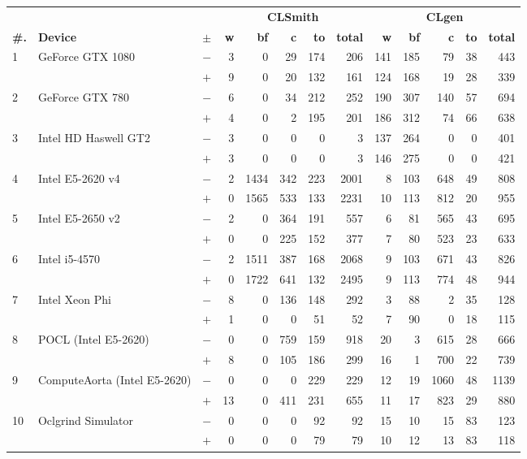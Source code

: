   \begin{tabular}{lll | rrrrr | rrrrr }
  \toprule
  & & & \multicolumn{5}{c|}{\textbf{CLSmith}} & \multicolumn{5}{c}{\textbf{CLgen}} \\
  \textbf{\#.} & \textbf{Device} & $\pm$ &
  \textbf{w} & \textbf{bf} & \textbf{c} & \textbf{to} & \textbf{total} &
  \textbf{w} & \textbf{bf} & \textbf{c} & \textbf{to} & \textbf{total} \\
  \midrule
  \multirow{ 2}{*}{1} & \multirow{ 2}{*}{GeForce GTX 1080} & $-$ & 3 & 0 & 29 & 174 & 206       & 141 & 185 & 79 & 38 & 443 \\& & $+$ & 9 & 0 & 20 & 132 & 161 & 124 & 168 & 19 & 28 & 339 \\
\hline
\multirow{ 2}{*}{2} & \multirow{ 2}{*}{GeForce GTX 780} & $-$ & 6 & 0 & 34 & 212 & 252       & 190 & 307 & 140 & 57 & 694 \\& & $+$ & 4 & 0 & 2 & 195 & 201 & 186 & 312 & 74 & 66 & 638 \\
\hline
\multirow{ 2}{*}{3} & \multirow{ 2}{*}{Intel HD Haswell GT2} & $-$ & 3 & 0 & 0 & 0 & 3       & 137 & 264 & 0 & 0 & 401 \\& & $+$ & 3 & 0 & 0 & 0 & 3 & 146 & 275 & 0 & 0 & 421 \\
\hline
\multirow{ 2}{*}{4} & \multirow{ 2}{*}{Intel E5-2620 v4} & $-$ & 2 & 1434 & 342 & 223 & 2001       & 8 & 103 & 648 & 49 & 808 \\& & $+$ & 0 & 1565 & 533 & 133 & 2231 & 10 & 113 & 812 & 20 & 955 \\
\hline
\multirow{ 2}{*}{5} & \multirow{ 2}{*}{Intel E5-2650 v2} & $-$ & 2 & 0 & 364 & 191 & 557       & 6 & 81 & 565 & 43 & 695 \\& & $+$ & 0 & 0 & 225 & 152 & 377 & 7 & 80 & 523 & 23 & 633 \\
\hline
\multirow{ 2}{*}{6} & \multirow{ 2}{*}{Intel i5-4570} & $-$ & 2 & 1511 & 387 & 168 & 2068       & 9 & 103 & 671 & 43 & 826 \\& & $+$ & 0 & 1722 & 641 & 132 & 2495 & 9 & 113 & 774 & 48 & 944 \\
\hline
\multirow{ 2}{*}{7} & \multirow{ 2}{*}{Intel Xeon Phi} & $-$ & 8 & 0 & 136 & 148 & 292       & 3 & 88 & 2 & 35 & 128 \\& & $+$ & 1 & 0 & 0 & 51 & 52 & 7 & 90 & 0 & 18 & 115 \\
\hline
\multirow{ 2}{*}{8} & \multirow{ 2}{*}{POCL (Intel E5-2620)} & $-$ & 0 & 0 & 759 & 159 & 918       & 20 & 3 & 615 & 28 & 666 \\& & $+$ & 8 & 0 & 105 & 186 & 299 & 16 & 1 & 700 & 22 & 739 \\
\hline
\multirow{ 2}{*}{9} & \multirow{ 2}{*}{ComputeAorta (Intel E5-2620)} & $-$ & 0 & 0 & 0 & 229 & 229       & 12 & 19 & 1060 & 48 & 1139 \\& & $+$ & 13 & 0 & 411 & 231 & 655 & 11 & 17 & 823 & 29 & 880 \\
\hline
\multirow{ 2}{*}{10} & \multirow{ 2}{*}{Oclgrind Simulator} & $-$ & 0 & 0 & 0 & 92 & 92       & 15 & 10 & 15 & 83 & 123 \\& & $+$ & 0 & 0 & 0 & 79 & 79 & 10 & 12 & 13 & 83 & 118 \\
  \bottomrule
\end{tabular}

